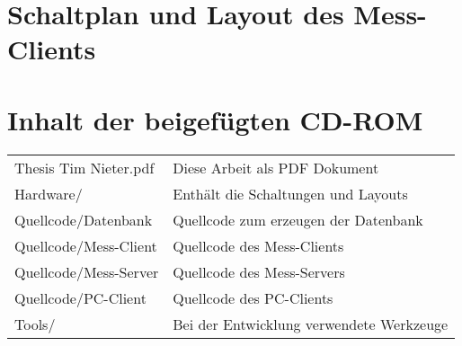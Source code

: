 \begin{appendix}

 {}

\chapter{Schaltplan und Layout des Mess-Clients}
\label{anhang_Schaltung}







\newpage


\chapter{Inhalt der beigefügten CD-ROM}
\label{anhang_cd}

\begin{table}[H]
\begin{center}
\begin{tabularx}{\textwidth}{ll}
 Thesis Tim Nieter.pdf & Diese Arbeit als PDF Dokument  \\
 Hardware/ & Enthält die Schaltungen und Layouts \\
 Quellcode/Datenbank & Quellcode zum erzeugen der Datenbank \\
 Quellcode/Mess-Client & Quellcode des Mess-Clients \\
 Quellcode/Mess-Server & Quellcode des Mess-Servers \\
 Quellcode/PC-Client & Quellcode des PC-Clients \\
 Tools/ & Bei der Entwicklung verwendete Werkzeuge

\end{tabularx}

\label{table_CD}
\end{center}
\end{table}

\end{appendix}
